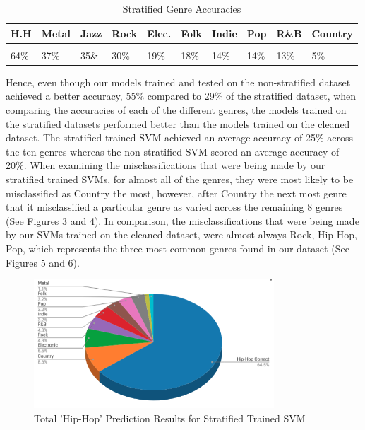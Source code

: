 \documentclass[journal]{IEEEtran}
\begin{document}
\begin{table}[h!]
    \label{tab:table1}
    \caption{Stratified Genre Accuracies}
    \begin{tabular}{|m{0.4cm}|m{0.5cm}|m{0.4cm}|m{0.45cm}|m{0.4cm}|m{0.4cm}|m{0.45cm}|m{0.4cm}|m{0.45cm}|m{0.4cm}}
    \textbf{H.H} & \textbf{Metal} & \textbf{Jazz} & \textbf{Rock} & \textbf{Elec.} & \textbf{Folk} & \textbf{Indie} & \textbf{Pop} & \textbf{R\&B} & \textbf{Country}\\
      \hline
      \\
	64\% & 37\% & 35\& & 30\% & 19\% & 18\% & 14\% & 14\% & 13\% & 5\%\\

    \end{tabular}
\end{table}

Hence, even though our models trained and tested on the non-stratified dataset achieved a better accuracy, 55\% compared to 29\% of the stratified dataset, when comparing the accuracies of each of the different genres, the models trained on the stratified datasets performed better than the models trained on the cleaned dataset. The stratified trained SVM achieved an average accuracy of 25\% across the ten genres whereas the non-stratified SVM scored an average accuracy of 20\%. When examining the misclassifications that were being made by our stratified trained SVMs, for almost all of the genres, they were most likely to be misclassified as Country the most, however, after Country the next most genre that it misclassified a particular genre as varied across the remaining 8 genres (See Figures 3 and 4). In comparison, the misclassifications that were being made by our SVMs trained on the cleaned dataset, were almost always Rock, Hip-Hop, Pop, which represents the three most common genres found in our dataset (See Figures 5 and 6).


\begin{figure}[h!]
\centering
\includegraphics[width=9cm]{Figure_5}
\caption{Total 'Hip-Hop' Prediction Results for Stratified Trained SVM}
\end{figure}
\end{document}
